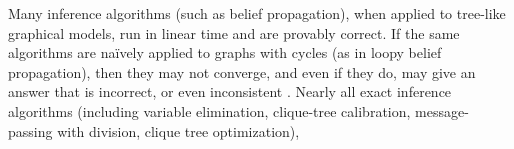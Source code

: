 \documentclass{article}
\begin{document}
Many inference algorithms (such as belief propagation),
when applied to tree-like graphical models,
run in linear time and are provably correct.
If the same algorithms are na{\"i}vely applied to graphs with cycles (as in loopy belief propagation),
then they may not converge, and even if they do,
may give an answer that is incorrect, or even inconsistent \parencite{wainwright2008graphical}.
Nearly all exact inference algorithms
(including variable elimination, clique-tree calibration, message-passing with division, clique tree optimization),
\end{document}
